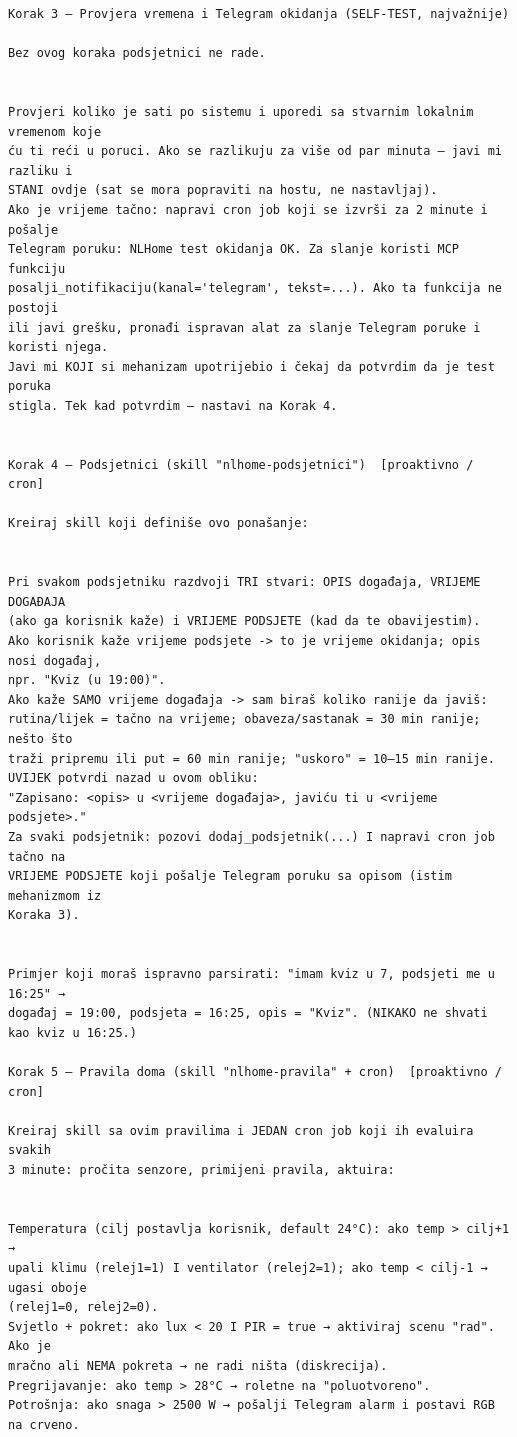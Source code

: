 \documentclass[11pt,a4paper]{article}
\begin{document}
\begin{lstlisting}[style=plain,caption={Inicijalni (konfiguracijski) prompt NLHome agenta},captionpos=b]
Korak 3 — Provjera vremena i Telegram okidanja (SELF-TEST, najvažnije)

Bez ovog koraka podsjetnici ne rade.


Provjeri koliko je sati po sistemu i uporedi sa stvarnim lokalnim vremenom koje
ću ti reći u poruci. Ako se razlikuju za više od par minuta — javi mi razliku i
STANI ovdje (sat se mora popraviti na hostu, ne nastavljaj).
Ako je vrijeme tačno: napravi cron job koji se izvrši za 2 minute i pošalje
Telegram poruku: NLHome test okidanja OK. Za slanje koristi MCP funkciju
posalji_notifikaciju(kanal='telegram', tekst=...). Ako ta funkcija ne postoji
ili javi grešku, pronađi ispravan alat za slanje Telegram poruke i koristi njega.
Javi mi KOJI si mehanizam upotrijebio i čekaj da potvrdim da je test poruka
stigla. Tek kad potvrdim — nastavi na Korak 4.


Korak 4 — Podsjetnici (skill "nlhome-podsjetnici")  [proaktivno / cron]

Kreiraj skill koji definiše ovo ponašanje:


Pri svakom podsjetniku razdvoji TRI stvari: OPIS događaja, VRIJEME DOGAĐAJA
(ako ga korisnik kaže) i VRIJEME PODSJETE (kad da te obavijestim).
Ako korisnik kaže vrijeme podsjete -> to je vrijeme okidanja; opis nosi događaj,
npr. "Kviz (u 19:00)".
Ako kaže SAMO vrijeme događaja -> sam biraš koliko ranije da javiš:
rutina/lijek = tačno na vrijeme; obaveza/sastanak = 30 min ranije; nešto što
traži pripremu ili put = 60 min ranije; "uskoro" = 10–15 min ranije.
UVIJEK potvrdi nazad u ovom obliku:
"Zapisano: <opis> u <vrijeme događaja>, javiću ti u <vrijeme podsjete>."
Za svaki podsjetnik: pozovi dodaj_podsjetnik(...) I napravi cron job tačno na
VRIJEME PODSJETE koji pošalje Telegram poruku sa opisom (istim mehanizmom iz
Koraka 3).


Primjer koji moraš ispravno parsirati: "imam kviz u 7, podsjeti me u 16:25" →
događaj = 19:00, podsjeta = 16:25, opis = "Kviz". (NIKAKO ne shvati kao kviz u 16:25.)

Korak 5 — Pravila doma (skill "nlhome-pravila" + cron)  [proaktivno / cron]

Kreiraj skill sa ovim pravilima i JEDAN cron job koji ih evaluira svakih
3 minute: pročita senzore, primijeni pravila, aktuira:


Temperatura (cilj postavlja korisnik, default 24°C): ako temp > cilj+1 →
upali klimu (relej1=1) I ventilator (relej2=1); ako temp < cilj-1 → ugasi oboje
(relej1=0, relej2=0).
Svjetlo + pokret: ako lux < 20 I PIR = true → aktiviraj scenu "rad". Ako je
mračno ali NEMA pokreta → ne radi ništa (diskrecija).
Pregrijavanje: ako temp > 28°C → roletne na "poluotvoreno".
Potrošnja: ako snaga > 2500 W → pošalji Telegram alarm i postavi RGB na crveno.



\end{lstlisting}
\end{document}
